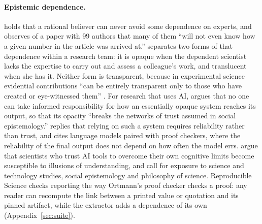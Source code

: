 \paragraph{Epistemic dependence.} \citet{hardwig1985dependence} holds that a rational believer can
never avoid some dependence on experts, and observes of a paper with 99 authors that many of them
``will not even know how a given number in the article was arrived at.'' \citet{wagenknecht2014opaque}
separates two forms of that dependence within a research team: it is opaque when the dependent
scientist lacks the expertise to carry out and assess a colleague's work, and translucent when she
has it. Neither form is transparent, because in experimental science evidential contributions ``can
be entirely transparent only to those who have created or eye-witnessed them''
\citep{wagenknecht2014opaque}. For research that uses AI, \citet{koskinen2023noepistemology}
argues that no one can take informed responsibility for how an essentially opaque system reaches
its output, so that its opacity ``breaks the networks of trust assumed in social epistemology.''
\citet{ortmann2025oracles} replies that relying on such a system requires reliability rather than
trust, and cites language models paired with proof checkers, where the reliability of the final
output does not depend on how often the model errs. \citet{messeri2024illusions} argue that
scientists who trust AI tools to overcome their own cognitive limits become susceptible to
illusions of understanding, and call for exposure to science and technology studies, social
epistemology and philosophy of science. Reproducible Science checks reporting the way Ortmann's
proof checker checks a proof: any reader can recompute the link between a printed value or quotation
and its pinned artifact, while the extractor adds a dependence of its own (Appendix~\ref{sec:suite}).
